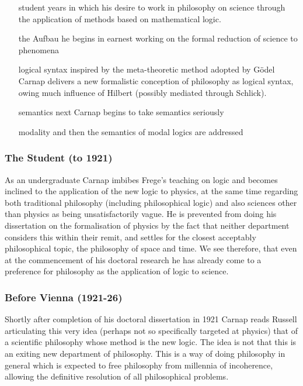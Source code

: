 \documentclass[10pt,titlepage]{book}
\def\ouml{\"o}
\begin{document}
\begin{itemize}
\item[student years] in which his desire to work in philosophy on science through the application of methods based on mathematical logic.
\item[the Aufbau] he begins in earnest working on the formal reduction of science to phenomena
\item[logical syntax] inspired by the meta-theoretic method adopted by G{\ouml}del Carnap delivers a new formalistic conception of philosophy as logical syntax, owing much influence of Hilbert (possibly mediated through Schlick).
\item[semantics] next Carnap begins to take semantics seriously
\item[modality] and then the semantics of modal logics are addressed
\end{itemize}

\subsubsection{The Student (to 1921)}

As an undergraduate Carnap imbibes Frege's teaching on logic and becomes inclined to the application of the new logic to physics, at the same  time regarding both traditional philosophy (including philosophical logic) and also sciences other than physics as being unsatisfactorily vague.
He is prevented from doing his dissertation on the formalisation of physics by the fact that neither department considers this within their remit, and settles for the closest acceptably philosophical topic, the philosophy of space and time.
We see therefore, that even at the commencement of his doctoral research he has already come to a preference for philosophy as the application of logic to science.

\subsubsection{Before Vienna (1921-26)}

Shortly after completion of his doctoral dissertation in 1921 Carnap reads Russell articulating this very idea (perhaps not so specifically targeted at physics) that of a scientific philosophy whose method is the new logic.
The idea is not that this is an exiting new department of philosophy.
This is a way of doing philosophy in general which is expected to free philosophy from millennia of incoherence, allowing the definitive resolution of all philosophical problems.
\end{document}
